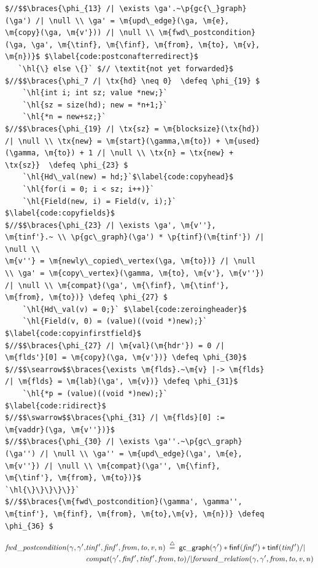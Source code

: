 \documentclass[acmsmall,screen]{acmart}  %
\makeatletter
\newcommand{\finf}{finf} %
\newcommand{\tinf}{tinf} %
\newcommand{\braces}[1]{\left\{\!\!\!\begin{array}{l@{}} #1 \end{array}\right\}} %
\newcommand{\ga}{\gamma} %
\newcommand{\defeq}{\mathbin{\stackrel{\triangle}{=}}} %
\newcommand{\tx}[1]{\text{#1}}
\newcommand{\p}[1]{\ensuremath{\mathsf{#1}}} \newcommand{\m}[1]{\ensuremath{\mathit{#1}}} \newcommand{\ma}[1]{\ensuremath{\mathcal{#1}}} \let\ramify\lightning
\newcommand{\hl}[1]{\colorbox{lightgray}{#1}} %
\makeatother
\begin{document}
\begin{figure}[!ht]
\begin{lstlisting}[multicols=2]
$//$$\braces{\phi_{13} /| \exists \ga'.~\p{gc{\_}graph}(\ga') /| \null \\ \ga' = \m{upd\_edge}(\ga, \m{e}, \m{copy}(\ga, \m{v'})) /| \null \\ \m{fwd\_postcondition}(\ga, \ga', \m{\tinf}, \m{\finf}, \m{from}, \m{to}, \m{v}, \m{n})}$ $\label{code:postconafterredirect}$
   `\hl{\} else \{}` $// \textit{not yet forwarded}$
$//$$\braces{\phi_7 /| \tx{hd} \neq 0}  \defeq \phi_{19} $
    `\hl{int i; int sz; value *new;}`
    `\hl{sz = size(hd); new = *n+1;}`
    `\hl{*n = new+sz;}`
$//$$\braces{\phi_{19} /| \tx{sz} = \m{blocksize}(\tx{hd}) /| \null \\ \tx{new} = \m{start}(\gamma,\m{to}) + \m{used}(\gamma, \m{to}) + 1 /| \null \\ \tx{n} = \tx{new} + \tx{sz}}  \defeq \phi_{23} $      
    `\hl{Hd\_val(new) = hd;}`$\label{code:copyhead}$
    `\hl{for(i = 0; i < sz; i++)}` 
    `\hl{Field(new, i) = Field(v, i);}` $\label{code:copyfields}$
$//$$\braces{\phi_{23} /| \exists \ga', \m{v''}, \m{tinf'}.~ \\ \p{gc\_graph}(\ga') * \p{tinf}(\m{tinf'}) /| \null \\ 
\m{v''} = \m{newly\_copied\_vertex(\ga, \m{to})} /| \null \\ \ga' = \m{copy\_vertex}(\gamma, \m{to}, \m{v'}, \m{v''}) /| \null \\ \m{compat}(\ga', \m{\finf}, \m{\tinf'}, \m{from}, \m{to})} \defeq \phi_{27} $
    `\hl{Hd\_val(v) = 0;}` $\label{code:zeroingheader}$
    `\hl{Field(v, 0) = (value)((void *)new);}` $\label{code:copyinfirstfield}$
$//$$\braces{\phi_{27} /| \m{val}(\m{hdr'}) = 0 /| \m{flds'}[0] = \m{copy}(\ga, \m{v'})} \defeq \phi_{30}$
$//$$\searrow$$\braces{\exists \m{flds}.~\m{v} |-> \m{flds} /| \m{flds} = \m{lab}(\ga', \m{v})} \defeq \phi_{31}$
    `\hl{*p = (value)((void *)new);}` $\label{code:ridirect}$
$//$$\swarrow$$\braces{\phi_{31} /| \m{flds}[0] := \m{vaddr}(\ga, \m{v''})}$
$//$$\braces{\phi_{30} /| \exists \ga''.~\p{gc\_graph}(\ga'') /| \null \\ \ga'' = \m{upd\_edge}(\ga', \m{e}, \m{v''}) /| \null \\ \m{compat}(\ga'', \m{\finf}, \m{\tinf'}, \m{from}, \m{to})}$
`\hl{\}\}\}\}\}}`
$//$$\braces{\m{fwd\_postcondition}(\gamma', \gamma'', \m{tinf'}, \m{finf}, \m{from}, \m{to},\m{v}, \m{n})} \defeq \phi_{36} $
\end{lstlisting}
\footnotesize{
\vspace{-0.8em}
\begin{equation*}
\begin{split}
\m{fwd\_postcondition}(\gamma, \ga', &\m{tinf'}, \m{finf'}, \m{from}, \m{to}, \m{v}, \m{n}) \; \defeq \; 
   \p{gc{\_}graph}(\ga') * \p{\finf}(\m{\finf'}) * \p{\tinf}(\m{\tinf'}) /| \null \\
   &\m{compat}(\ga', \m{\finf'}, \m{\tinf'}, \m{from}, \m{to}) /|
   \m{forward\_relation}(\ga, \ga', \m{from}, \m{to}, \m{v}, \m{n})
\end{split}
\end{equation*}

}
\end{figure}
\end{document}
